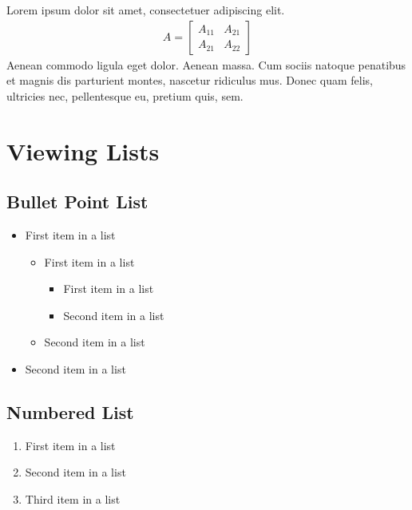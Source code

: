 \documentclass[11pt]{scrartcl} %
\begin{document}
Lorem ipsum dolor sit amet, consectetuer adipiscing elit. 
\begin{align}
	A = 
	\begin{bmatrix}
		A_{11} & A_{21} \\
		A_{21} & A_{22}
	\end{bmatrix}
\end{align}
Aenean commodo ligula eget dolor. Aenean massa. Cum sociis natoque penatibus et magnis dis parturient montes, nascetur ridiculus mus. Donec quam felis, ultricies nec, pellentesque eu, pretium quis, sem.


\section{Viewing Lists}

\subsection{Bullet Point List}

\begin{itemize}
	\item First item in a list 
		\begin{itemize}
		\item First item in a list 
			\begin{itemize}
			\item First item in a list 
			\item Second item in a list 
			\end{itemize}
		\item Second item in a list 
		\end{itemize}
	\item Second item in a list 
\end{itemize}


\subsection{Numbered List}

\begin{enumerate}
	\item First item in a list 
	\item Second item in a list 
	\item Third item in a list
\end{enumerate}
\end{document}

